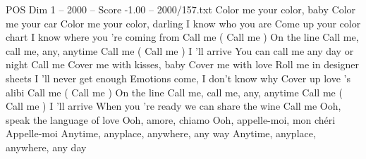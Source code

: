 \begin{textsample}{POS Dim 1 – 2000 – Score -1.00 – 2000/157.txt}  \label{ex:f1_pos_039}
Color me your color, baby Color me your car Color me your color, darling I know who you are Come up your color chart I know where you 're coming from Call me ( Call me ) On the line Call me, call me, any, anytime Call me ( Call me ) I 'll arrive You can call me any day or night Call me Cover me with kisses, baby Cover me with love Roll me in designer sheets I 'll never get enough Emotions come, I don't know why Cover up love 's alibi Call me ( Call me ) On the line Call me, call me, any, anytime Call me ( Call me ) I 'll arrive When you 're ready we can share the wine Call me Ooh, speak the language of love Ooh, amore, chiamo Ooh, appelle-moi, mon chéri Appelle-moi Anytime, anyplace, anywhere, any way Anytime, anyplace, anywhere, any day

\end{textsample}
